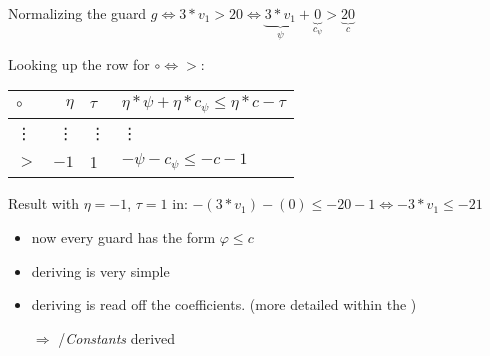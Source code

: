 \begin{frame} %
	\begin{example}
		Normalizing the guard $g \Leftrightarrow 3*v_1>20 \Leftrightarrow \underbrace{3*v_1}_{\psi}+\underbrace{0}_{c_\psi} > \underbrace{20}_{c}$ \vspace*{-1em}\newline
		
		Looking up the row for $\circ \Leftrightarrow >$: 
		\begin{tabular}{|l|r|l|l|}
			\hline
			$\circ$ 	& $\eta$ 	& $\tau$ 	&  $ \eta*\psi + \eta*c_{\psi} \le \eta*c-\tau$ \\ 
			\hline \hline
			\vdots 		& \vdots 	&  \vdots 		& \vdots \\ \hline
			$>$ 		& $-1$		&  1 		& $-\psi - c_{\psi} \le -c -1 $ \\ \hline
		\end{tabular} \newline
	
		Result with $\eta=-1$, $\tau = 1$ in: $-(3*v_1)-(0)\le-20-1 \Leftrightarrow -3*v_1 \le -21$
	\end{example}
\end{frame}

\begin{frame} %
	\begin{itemize}
		\item now every guard has the form $\varphi \le c$
		\item deriving \guardconstants is very simple
		\item deriving \guardmatrix is read off the coefficients.
		\hspace*{1.5cm}(more detailed within the \updatematrix)
		\item[$\Rightarrow$] \updatematrix/\textit{Constants} derived \checkmark
	\end{itemize}
\end{frame}

